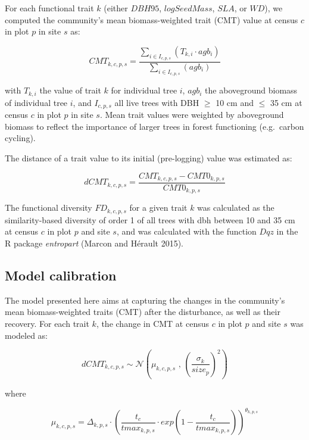 \documentclass[]{elsarticle} %
\begin{document}
For each functional trait \(k\) (either \(DBH95\), \(logSeedMass\),
\(SLA\), or \(WD\)), we computed the community's mean biomass-weighted
trait (CMT) value at census \(c\) in plot \(p\) in site \(s\) as:

\begin{equation}  
CMT_{k,c,p,s} = \frac{\sum_{i \in I_{c,p,s}}(T_{k,i}\cdot agb_i)}{\sum_{i \in I_{c,p,s}}(agb_i)}
\end{equation}

with \(T_{k,i}\) the value of trait \(k\) for individual tree \(i\),
\(agb_i\) the aboveground biomass of individual tree \(i\), and
\(I_{c,p,s}\) all live trees with DBH \(\geq\) 10 cm and \(\leq\) 35 cm
at census \(c\) in plot \(p\) in site \(s\). Mean trait values were
weighted by aboveground biomass to reflect the importance of larger
trees in forest functioning (e.g.~carbon cycling).

The distance of a trait value to its initial (pre-logging) value was
estimated as:

\begin{equation}  
dCMT_{k,c,p,s} = \frac{CMT_{k,c,p,s} - CMT0_{k,p,s}}{CMT0_{k,p,s}}
\end{equation}

The functional diversity \(FD_{k,c,p,s}\) for a given trait \(k\) was
calculated as the similarity-based diversity of order 1 of all trees
with dbh between 10 and 35 cm at census \(c\) in plot \(p\) and site
\(s\), and was calculated with the function \(Dqz\) in the R package
\emph{entropart} (Marcon and Hérault 2015).

\subsection{Model calibration}\label{model-calibration}

The model presented here aims at capturing the changes in the
community's mean biomass-weighted traits (CMT) after the disturbance, as
well as their recovery. For each trait \(k\), the change in CMT at
census \(c\) in plot \(p\) and site \(s\) was modeled as:

\begin{equation}  
dCMT_{k,c,p,s} \sim \mathcal{N}\left( \mu_{k,c,p,s}\text{ , } \left(\frac{\sigma_k}{size_p}\right)^2\right)
\end{equation}

where

\begin{equation}  
\mu_{k,c,p,s} = \Delta_{k,p,s} \cdot \left( \frac{t_c}{tmax_{k,p,s}} \cdot exp\left(1-\frac{t_c}{tmax_{k,p,s}}\right) \right)^{\theta_{k,p,s}}
\end{equation}
\end{document}
